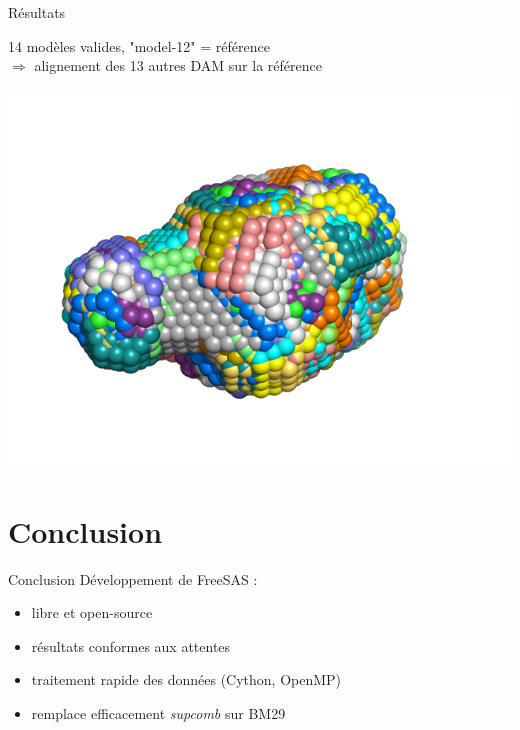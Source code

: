 \documentclass{beamer}
\begin{document}
\begin{frame}{R\'esultats}

14 mod\`eles valides, "model-12" = r\'ef\'erence\\
$\Rightarrow$ alignement des 13 autres DAM sur la r\'ef\'erence

\begin{minipage}{\linewidth}
    \includegraphics[scale=0.45]{alignedmodels.png}
\end{minipage}
\end{frame}

\section*{Conclusion}

\begin{frame}{Conclusion}
D\'eveloppement de FreeSAS : 
\begin{itemize}
\item libre et open-source
\item r\'esultats conformes aux attentes
\item traitement rapide des donn\'ees (Cython, OpenMP)
\item remplace efficacement \textit{supcomb} sur BM29
\end{itemize}
\end{frame}
\end{document}
